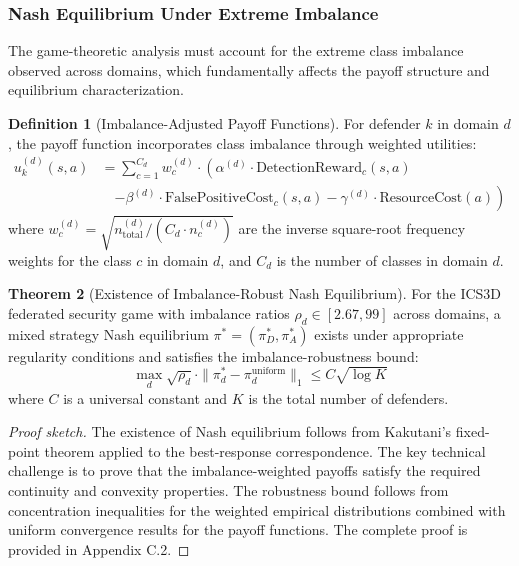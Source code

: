 \documentclass[12pt,a4paper]{article}
\theoremstyle{definition}
\newtheorem{theorem}{Theorem}[section]
\newtheorem{definition}[theorem]{Definition}
\begin{document}
\subsubsection{Nash Equilibrium Under Extreme Imbalance}

The game-theoretic analysis must account for the extreme class imbalance observed across domains, which fundamentally affects the payoff structure and equilibrium characterization.

\begin{definition}[Imbalance-Adjusted Payoff Functions]
\label{def:imbalance_payoffs}
For defender $k$ in domain $d$, the payoff function incorporates class imbalance through weighted utilities:
\begin{align}
u_k^{(d)}(s, a) &= \sum_{c=1}^{C_d} w_c^{(d)} \cdot \left(\alpha^{(d)} \cdot \text{DetectionReward}_c(s, a) \right. \nonumber\\
&\quad \left. - \beta^{(d)} \cdot \text{FalsePositiveCost}_c(s, a) - \gamma^{(d)} \cdot \text{ResourceCost}(a)\right)
\end{align}
where $w_c^{(d)} = \sqrt{n_{\text{total}}^{(d)}/(C_d \cdot n_c^{(d)})}$ are the inverse square-root frequency weights for the class $c$ in domain $d$, and $C_d$ is the number of classes in domain $d$.
\end{definition}

\begin{theorem}[Existence of Imbalance-Robust Nash Equilibrium]
\label{thm:nash_equilibrium}
For the ICS3D federated security game with imbalance ratios $\rho_d \in [2.67, 99]$ across domains, a mixed strategy Nash equilibrium $\pi^* = (\pi_D^*, \pi_A^*)$ exists under appropriate regularity conditions and satisfies the imbalance-robustness bound:
\begin{equation}
\max_d \sqrt{\rho_d} \cdot \|\pi_d^* - \pi_d^{\text{uniform}}\|_1 \leq C \sqrt{\log K}
\end{equation}
where $C$ is a universal constant and $K$ is the total number of defenders.
\end{theorem}

\begin{proof}[Proof sketch]
The existence of Nash equilibrium follows from Kakutani's fixed-point theorem applied to the best-response correspondence. The key technical challenge is to prove that the imbalance-weighted payoffs satisfy the required continuity and convexity properties. The robustness bound follows from concentration inequalities for the weighted empirical distributions combined with uniform convergence results for the payoff functions. The complete proof is provided in Appendix C.2.
\end{proof}
\end{document}
